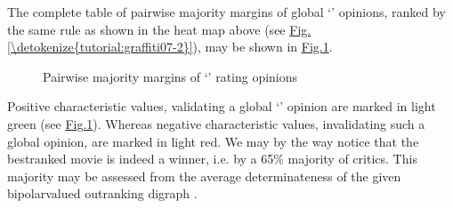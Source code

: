 \documentclass[a4paper,10pt,english]{sphinxhowto}
\let\sphinxpxdimen\pdfpxdimen\else\newdimen\sphinxpxdimen
\begin{document}
The complete table of pairwise majority margins of global ‘’ opinions, ranked by the same rule as shown in the
heat map above (see \hyperref[\detokenize{tutorial:graffiti07-2}]{Fig.\@ \ref{\detokenize{tutorial:graffiti07-2}}}), may be shown in \hyperref[\detokenize{tutorial:graffiti07-3}]{Fig.\@ \ref{\detokenize{tutorial:graffiti07-3}}}.

\begin{sphinxVerbatim}[commandchars=\\\{\},numbers=left,firstnumber=1,stepnumber=1]
  
 \PYGZbs{}
\end{sphinxVerbatim}

\begin{figure}[htbp]
\centering
\capstart

\noindent\sphinxincludegraphics[width=650\sphinxpxdimen]{{graffiti07_3}.png}
\caption{Pairwise majority margins of ‘’ rating opinions}\label{\detokenize{tutorial:graffiti07-3}}\end{figure}

Positive characteristic values, validating a global ‘’ opinion are marked in light green (see \hyperref[\detokenize{tutorial:graffiti07-3}]{Fig.\@ \ref{\detokenize{tutorial:graffiti07-3}}}). Whereas negative characteristic values, invalidating such a global opinion, are marked in light red. We may by the way notice that the best\sphinxhyphen{}ranked movie  is indeed a  winner, i.e.  by a 65\% majority of critics. This majority may be assessed from the average determinateness of the given bipolar\sphinxhyphen{}valued outranking digraph .

\begin{sphinxVerbatim}[commandchars=\\\{\}]
    
\end{sphinxVerbatim}
\end{document}
